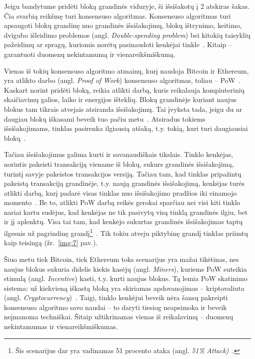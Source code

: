 
 \label{subsection:blockchain-immutability}

Jeigu bandytume pridėti bloką grandinės viduryje, ši išsišakotų į 2 atskiras šakas. Čia svarbią reikšmę turi konsensuso algoritmas. Konsensuso algoritmas turi apsaugoti blokų grandinę nuo grandinės išsišakojimų, blokų ištrynimo, keitimo, dvigubo išleidimo problemos (angl. \textit{Double-spending problem}) bei kitokių taisyklių pažeidimų ar spragų, kuriomis norėtų pasinaudoti kenkėjai tinkle~\cite{baliga2017understanding}. Kitaip – garantuoti duomenų nekintamumą ir vienareikšmiškumą.

Vienas iš tokių konsensuso algoritmo atmainų, kurį naudoja Bitcoin ir Ethereum, yra atlikto darbo (angl. \textit{Proof of Work}) konsensuso algoritmas, toliau – PoW~\cite{gervais2016security}. Kaskart norint pridėti bloką, reikia atlikti darbą, kuris reikalauja kompiuterinių skaičiavimų galios, laiko ir energijos išteklių. Blokų grandinėje kuriant naujus blokus tam tikrais atvejais atsiranda išsišakojimų. Tai įvyksta tada, jeigu du ar daugiau blokų iškasami beveik tuo pačiu metu~\cite{zheng2017overview}. Atsiradus tokiems išsišakojimams, tinklas pasirenka ilgiausią atšaką, t.y. tokią, kuri turi daugiausiai blokų~\cite{zheng2017overview}. 

Tačiau išsišakojimus galima kurti ir savanaudiškais tikslais. Tinklo kenkėjas, norintis pakeisti transakciją viename iš blokų, sukurs grandinės išsišakojimą, turintį savyje pakeistos transakcijos versiją. Tačiau tam, kad tinklas pripažintų pakeistą transakciją grandinėje, t.y. naują grandinės išsišakojimą, kenkėjas turės atlikti darbą, kurį padarė visas tinklas nuo išsišakojimo pradžios iki einamojo momento~\cite{nakamoto2008bitcoin}. Be to, atlikti PoW darbą reikės gerokai sparčiau nei visi kiti tinklo nariai kartu sudėjus, kad kenkėjas ne tik pasivytų visą tinklą grandinės ilgiu, bet ir jį aplenktų. Visa tai tam, kad kenkėjo sukurtas grandinės išsišakojimas taptų ilgesnis už pagrindinę grandį\footnote{Šis scenarijus dar yra vadinamas 51 procento ataka (angl. \textit{51\% Attack)}~\cite{baliga2017understanding}.}~\cite{nakamoto2008bitcoin}. Tik tokiu atveju piktybinę grandį tinklas priimtų kaip teisingą (žr.~\ref{img:7} pav.).

Šiuo metu tiek Bitcoin, tiek Ethereum toks scenarijus yra mažai tikėtinas, nes naujus blokus sukuria didelis kiekis kasėjų (angl. \textit{Miners}), kuriems PoW suteikia stimulą (angl. \textit{Incentive}) kasti, t.y. kurti naujus blokus. Tą lemia PoW skatinimo sistema: už kiekvieną iškastą bloką yra skiriamas apdovanojimas – kriptovaliuta (angl. \textit{Cryptocurrency})~\cite{nakamoto2008bitcoin}. Taigi, tinklo kenkėjui beveik nėra šansų pakreipti konsensuso algoritmo savo naudai – to daryti tiesiog neapsimoka ir beveik neįmanoma techniškai. Šitaip užtikrinamas vienas iš reikalavimų – duomenų nekintamumas ir vienareikšmiškumas.

